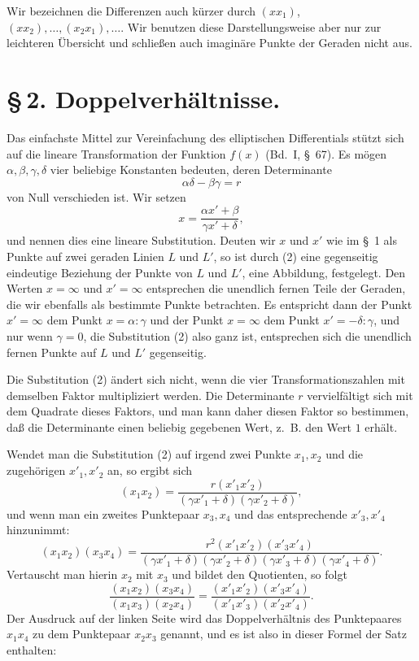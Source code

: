 \documentclass[11pt]{article}
\begin{document}
Wir bezeichnen die Differenzen auch kürzer durch $(xx_1)$, $(xx_2),\ldots,(x_2x_1),\ldots$. Wir benutzen diese Darstellungsweise aber nur zur leichteren Übersicht und schließen auch imaginäre Punkte der Geraden nicht aus.

\section*{\S\,2. Doppelverhältnisse.}

Das einfachste Mittel zur Vereinfachung des elliptischen Differentials stützt sich auf die lineare Transformation der Funktion $f(x)$ (Bd.~I, \S~67). Es mögen $\alpha,\beta,\gamma,\delta$ vier beliebige Konstanten bedeuten, deren Determinante
\begin{equation}
\alpha\delta-\beta\gamma=r
\tag{1}
\end{equation}
von Null verschieden ist. Wir setzen
\begin{equation}
x=\frac{\alpha x'+\beta}{\gamma x'+\delta},
\tag{2}
\end{equation}
und nennen dies eine lineare Substitution. Deuten wir $x$ und $x'$ wie im \S~1 als Punkte auf zwei geraden Linien $L$ und $L'$, so ist durch (2) eine gegenseitig eindeutige Beziehung der Punkte von $L$ und $L'$, eine Abbildung, festgelegt. Den Werten $x=\infty$ und $x'=\infty$ entsprechen die unendlich fernen Teile der Geraden, die wir ebenfalls als bestimmte Punkte betrachten. Es entspricht dann der Punkt $x'=\infty$ dem Punkt $x=\alpha:\gamma$ und der Punkt $x=\infty$ dem Punkt $x'=-\delta:\gamma$, und nur wenn $\gamma=0$, die Substitution (2) also ganz ist, entsprechen sich die unendlich fernen Punkte auf $L$ und $L'$ gegenseitig.

Die Substitution (2) ändert sich nicht, wenn die vier Transformationszahlen mit demselben Faktor multipliziert werden. Die Determinante $r$ vervielfältigt sich mit dem Quadrate dieses Faktors, und man kann daher diesen Faktor so bestimmen, daß die Determinante einen beliebig gegebenen Wert, z.~B. den Wert $1$ erhält.

Wendet man die Substitution (2) auf irgend zwei Punkte $x_1,x_2$ und die zugehörigen $x'_1,x'_2$ an, so ergibt sich
\[
(x_1x_2)=\frac{r(x'_1x'_2)}{(\gamma x'_1+\delta)(\gamma x'_2+\delta)},
\]
und wenn man ein zweites Punktepaar $x_3,x_4$ und das entsprechende $x'_3,x'_4$ hinzunimmt:
\[
(x_1x_2)(x_3x_4)=\frac{r^2(x'_1x'_2)(x'_3x'_4)}{(\gamma x'_1+\delta)(\gamma x'_2+\delta)(\gamma x'_3+\delta)(\gamma x'_4+\delta)}.
\]
Vertauscht man hierin $x_2$ mit $x_3$ und bildet den Quotienten, so folgt
\begin{equation}
\frac{(x_1x_2)(x_3x_4)}{(x_1x_3)(x_2x_4)}=\frac{(x'_1x'_2)(x'_3x'_4)}{(x'_1x'_3)(x'_2x'_4)}.
\tag{3}
\end{equation}
Der Ausdruck auf der linken Seite wird das Doppelverhältnis des Punktepaares $x_1x_4$ zu dem Punktepaar $x_2x_3$ genannt, und es ist also in dieser Formel der Satz enthalten:
\end{document}
